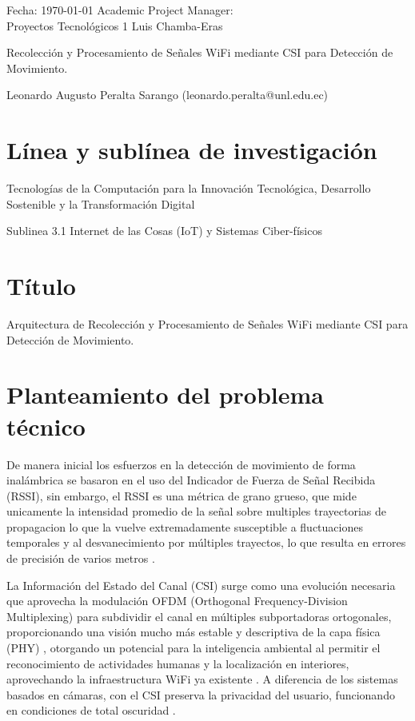 \documentclass[12pt, a4paper]{article}
\begin{document}
\onehalfspacing

Fecha: \today{} \hfill{} Academic Project Manager: \\
Proyectos Tecnológicos 1 \hfill{} Luis Chamba-Eras

{\LARGE Recolección y Procesamiento de Señales WiFi mediante CSI para Detección de Movimiento.}

{\Large Leonardo Augusto Peralta Sarango (leonardo.peralta@unl.edu.ec)}

\vspace{0.4in}

\singlespacing
\tableofcontents

\onehalfspacing

\section{Línea y sublínea de investigación}
Tecnologías de la Computación para la Innovación Tecnológica, Desarrollo Sostenible y la Transformación Digital
\hspace{0.5cm}

Sublinea 3.1 Internet de las Cosas (IoT) y Sistemas Ciber-físicos

\section{Título}
Arquitectura de Recolección y Procesamiento de Señales WiFi mediante CSI para Detección de Movimiento.

\section{Planteamiento del problema técnico}

De manera inicial los esfuerzos en la detección de movimiento de forma inalámbrica se basaron en el uso del Indicador de Fuerza de Señal Recibida (RSSI)\cite{wiesp}, sin embargo, el RSSI es una métrica de grano grueso, que mide unicamente la intensidad promedio de la señal sobre multiples trayectorias de propagacion lo que la vuelve extremadamente susceptible a fluctuaciones temporales y al desvanecimiento por múltiples trayectos, lo que resulta en errores de precisión de varios metros \cite{kim2026csi}\cite{avola2025transformer}\cite{mosefi22}.

La Información del Estado del Canal (CSI) surge como una evolución necesaria que aprovecha la modulación OFDM (Orthogonal Frequency-Division Multiplexing) para subdividir el canal en múltiples subportadoras ortogonales, proporcionando una visión mucho más estable y descriptiva de la capa física (PHY) \cite{mykytyn2025channel} \cite{cominelli2023exposingcsisystematicinvestigation} \cite{yang2023sensefilibrarybenchmarkdeeplearningempowered}, otorgando un potencial para la inteligencia ambiental al permitir el reconocimiento de actividades humanas y la localización en interiores, aprovechando la infraestructura WiFi ya existente\cite{kim2026csi} \cite{barahimi2024context} \cite{custance2026why}. A diferencia de los sistemas basados en cámaras, con el CSI preserva la privacidad del usuario, funcionando en condiciones de total oscuridad \cite{avola2025transformer} \cite{geng2022denspose}.
\end{document}
